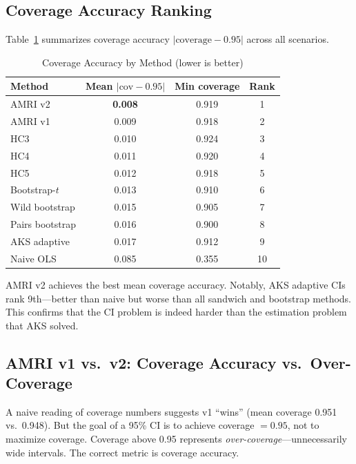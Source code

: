 \documentclass[12pt]{article}
\theoremstyle{definition}
\theoremstyle{remark}
\begin{document}
\subsection{Coverage Accuracy Ranking}

Table~\ref{tab:accuracy} summarizes coverage accuracy $|\text{coverage} - 0.95|$ across all scenarios.

\begin{table}[H]
\centering
\caption{Coverage Accuracy by Method (lower is better)}
\label{tab:accuracy}
\begin{tabular}{lccc}
\toprule
Method & Mean $|\text{cov} - 0.95|$ & Min coverage & Rank \\
\midrule
AMRI v2 & \textbf{0.008} & 0.919 & 1 \\
AMRI v1 & 0.009 & 0.918 & 2 \\
HC3 & 0.010 & 0.924 & 3 \\
HC4 & 0.011 & 0.920 & 4 \\
HC5 & 0.012 & 0.918 & 5 \\
Bootstrap-$t$ & 0.013 & 0.910 & 6 \\
Wild bootstrap & 0.015 & 0.905 & 7 \\
Pairs bootstrap & 0.016 & 0.900 & 8 \\
AKS adaptive & 0.017 & 0.912 & 9 \\
Naive OLS & 0.085 & 0.355 & 10 \\
\bottomrule
\end{tabular}
\end{table}

AMRI v2 achieves the best mean coverage accuracy. Notably, AKS adaptive CIs rank 9th---better than naive but worse than all sandwich and bootstrap methods. This confirms that the CI problem is indeed harder than the estimation problem that AKS solved.

\subsection{AMRI v1 vs.\ v2: Coverage Accuracy vs.\ Over-Coverage}

A naive reading of coverage numbers suggests v1 ``wins'' (mean coverage 0.951 vs.\ 0.948). But the goal of a 95\% CI is to achieve coverage $= 0.95$, not to maximize coverage. Coverage above 0.95 represents \emph{over-coverage}---unnecessarily wide intervals. The correct metric is coverage accuracy.
\end{document}
